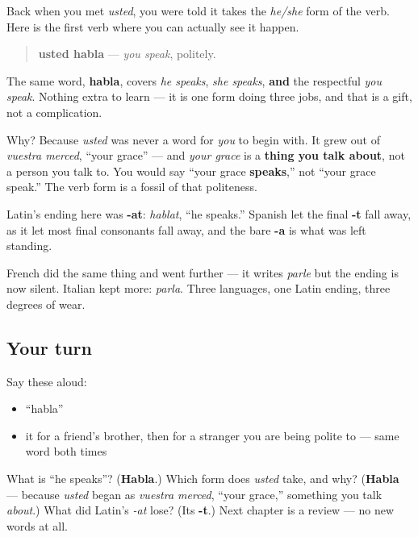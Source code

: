 \begin{grammarlens}[title={Grammar Lens: the same form does a second job}]
Back when you met \emph{usted}, you were told it takes the \emph{he/she} form of the verb. Here is the first verb where you can actually see it happen.

\begin{quote}
\textbf{usted habla} — \emph{you speak}, politely.
\end{quote}

The same word, \textbf{habla}, covers \emph{he speaks}, \emph{she speaks}, \textbf{and} the respectful \emph{you speak}. Nothing extra to learn — it is one form doing three jobs, and that is a gift, not a complication.

Why? Because \emph{usted} was never a word for \emph{you} to begin with. It grew out of \emph{vuestra merced}, \textquotedblleft{}your grace\textquotedblright{} — and \emph{your grace} is a \textbf{thing you talk about}, not a person you talk to. You would say \textquotedblleft{}your grace \textbf{speaks},\textquotedblright{} not \textquotedblleft{}your grace speak.\textquotedblright{} The verb form is a fossil of that politeness.
\end{grammarlens}

\begin{cousinweb}
Latin's ending here was \textbf{-at}: \emph{hablat}, \textquotedblleft{}he speaks.\textquotedblright{} Spanish let the final \textbf{-t} fall away, as it let most final consonants fall away, and the bare \textbf{-a} is what was left standing.

French did the same thing and went further — it writes \emph{parle} but the ending is now silent. Italian kept more: \emph{parla}. Three languages, one Latin ending, three degrees of wear.
\end{cousinweb}

\subsection*{Your turn}
Say these aloud:

\begin{itemize}
\raggedright
  \item \textquotedblleft{}habla\textquotedblright{}
  \item it for a friend's brother, then for a stranger you are being polite to — same word both times
\end{itemize}

\begin{tcolorbox}[breakable,colback=teal!4,colframe=teal!35!black,title={Before you move on}]
What is \textquotedblleft{}he speaks\textquotedblright{}? (\textbf{Habla}.) Which form does \emph{usted} take, and why? (\textbf{Habla} — because \emph{usted} began as \emph{vuestra merced}, \textquotedblleft{}your grace,\textquotedblright{} something you talk \emph{about}.) What did Latin's \emph{-at} lose? (Its \textbf{-t}.) Next chapter is a review — no new words at all.
\end{tcolorbox}
